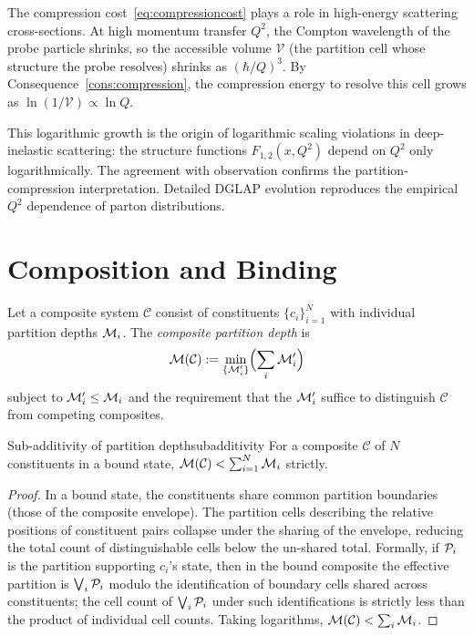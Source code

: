 The compression cost~\eqref{eq:compressioncost} plays a role in high-energy scattering cross-sections. At high momentum transfer $Q^{2}$, the Compton wavelength of the probe particle shrinks, so the accessible volume $\mathcal{V}$ (the partition cell whose structure the probe resolves) shrinks as $(\hbar/Q)^{3}$. By Consequence~\ref{cons:compression}, the compression energy to resolve this cell grows as $\ln(1/\mathcal{V})\propto \ln Q$.

This logarithmic growth is the origin of logarithmic scaling violations in deep-inelastic scattering: the structure functions $F_{1,2}(x,Q^{2})$ depend on $Q^{2}$ only logarithmically. The agreement with observation confirms the partition-compression interpretation. Detailed DGLAP evolution reproduces the empirical $Q^{2}$ dependence of parton distributions.

\section{Composition and Binding}
\label{sec:binding}

\begin{definition}
\label{def:depthcomposite}
Let a composite system $\mathcal{C}$ consist of constituents $\{c_{i}\}_{i=1}^{N}$ with individual partition depths $\mathcal{M}_{i}$. The \emph{composite partition depth} is
\begin{equation*}
\mathcal{M}(\mathcal{C}):=\min_{\{\mathcal{M}'_{i}\}}\Bigl(\sum_{i}\mathcal{M}'_{i}\Bigr)
\end{equation*}
subject to $\mathcal{M}'_{i}\le\mathcal{M}_{i}$ and the requirement that the $\mathcal{M}'_{i}$ suffice to distinguish $\mathcal{C}$ from competing composites.
\end{definition}

\begin{consequence}{Sub-additivity of partition depth}{subadditivity}
For a composite $\mathcal{C}$ of $N$ constituents in a bound state, $\mathcal{M}(\mathcal{C})<\sum_{i=1}^{N}\mathcal{M}_{i}$ strictly.
\end{consequence}

\begin{proof}
In a bound state, the constituents share common partition boundaries (those of the composite envelope). The partition cells describing the relative positions of constituent pairs collapse under the sharing of the envelope, reducing the total count of distinguishable cells below the un-shared total. Formally, if $\mathcal{P}_{i}$ is the partition supporting $c_{i}$'s state, then in the bound composite the effective partition is $\bigvee_{i}\mathcal{P}_{i}$ modulo the identification of boundary cells shared across constituents; the cell count of $\bigvee_{i}\mathcal{P}_{i}$ under such identifications is strictly less than the product of individual cell counts. Taking logarithms, $\mathcal{M}(\mathcal{C})<\sum_{i}\mathcal{M}_{i}$.
\end{proof}

